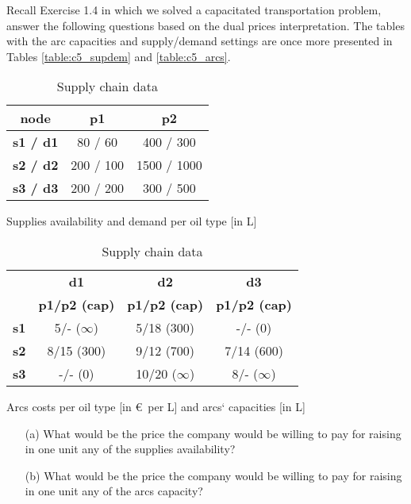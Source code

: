 Recall Exercise 1.4 in which we solved a capacitated transportation problem, answer the following questions based on the dual prices interpretation. The tables with the arc capacities and supply/demand settings are once more presented in Tables \ref{table:c5_supdem} and \ref{table:c5_arcs}.

\begin{table}[h!]
	\begin{subtable}[h]{0.4\textwidth}
		\begin{center}
		\begin{tabular}{c|cc}
			\textbf{node} & \textbf{p1} & \textbf{p2} \\
			\hline
			\textbf{s1 / d1} & 80 / 60 & 400 / 300 \\
			\textbf{s2 / d2} & 200 / 100 & 1500 / 1000 \\
			\textbf{s3 / d3} & 200 / 200 & 300 / 500 \\
		\end{tabular}
		\end{center}
		\caption{Supplies availability and demand per oil type [in L]}
		\label{table:c5_supdem}
	\end{subtable}
	\hfill
	\begin{subtable}[h]{0.55\textwidth}
		\begin{center}
			\begin{tabular}{c|ccc}
				 & \textbf{d1} & \textbf{d2} & \textbf{d3}\\
				 & \textbf{p1/p2 (cap)} & \textbf{p1/p2 (cap)} & \textbf{p1/p2 (cap)}\\
				\hline
				\textbf{s1} & 5/- ($\infty$) & 5/18 (300) & -/- (0)\\
				\textbf{s2} & 8/15 (300) & 9/12 (700) & 7/14 (600)\\
				\textbf{s3} & -/- (0) & 10/20 ($\infty$) & 8/- ($\infty$)\\
			\end{tabular}
		\end{center}
		\caption{Arcs costs per oil type [in \euro \ per L] and arcs` capacities [in L]}
		\label{table:c5_arcs}
	\end{subtable}
	\caption{Supply chain data}
	\label{table:c5_sc}
\end{table}
%
\begin{itemize}
	\item [(a)] What would be the price the company would be willing to pay for raising in one unit any of the supplies availability?

	\item [(b)] What would be the price the company would be willing to pay for raising in one unit any of the arcs capacity?	
\end{itemize}
